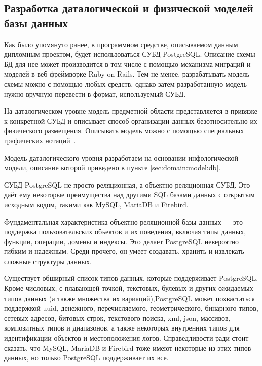\subsection{Разработка даталогической и физической моделей базы данных}
\label{sec:design:db}

Как было упомянуто ранее, в программном средстве, описываемом данным дипломным проектом, будет использоваться
СУБД PostgreSQL. Описание схемы БД для нее может производится в том числе с помощью механизма миграций и моделей в веб-фреймворке
Ruby on Rails. Тем не менее, разрабатывать модель схемы можно с помощью любых средств, однако затем разработанную 
модель нужно вручную перевести в формат, используемый СУБД. 

На даталогическом уровне модель предметной области представляется в привязке к конкретной СУБД и описывает способ
организации данных безотносительно их физического размещения. Описывать модель можно с помощью специальных
графических нотаций~\cite{kulikov_db_workbook}. 

Модель даталогического уровня разработаем на основании инфологической модели, описание которой приведено в
пункте \ref{sec:domain:model:db}. 

СУБД PostgreSQL не просто реляционная, а объектно-реляционная \linebreak СУБД. Это даёт ему некоторые преимущества над другими SQL
базами данных с открытым исходным кодом, такими как MySQL, MariaDB и Firebird.

Фундаментальная характеристика объектно-реляционной базы данных — это поддержка пользовательских объектов и их
поведения, включая типы данных, функции, операции, домены и индексы. Это делает PostgreSQL невероятно гибким и надежным.
Среди прочего, он умеет создавать, хранить и извлекать сложные структуры данных.

Существует обширный список типов данных, которые поддерживает PostgreSQL. Кроме числовых, с плавающей точкой, текстовых,
булевых и других ожидаемых типов данных (а также множества их вариаций),\linebreak PostgreSQL может похвастаться поддержкой uuid,
денежного, перечисляемого, геометрического, бинарного типов, сетевых адресов, битовых строк, текстового поиска, xml,
json, массивов, композитных типов и диапазонов, а также некоторых внутренних типов для идентификации объектов и
местоположения логов. Справедливости ради стоит сказать, что MySQL, MariaDB и Firebird тоже имеют некоторые из этих
типов данных, но только PostgreSQL поддерживает их все.

